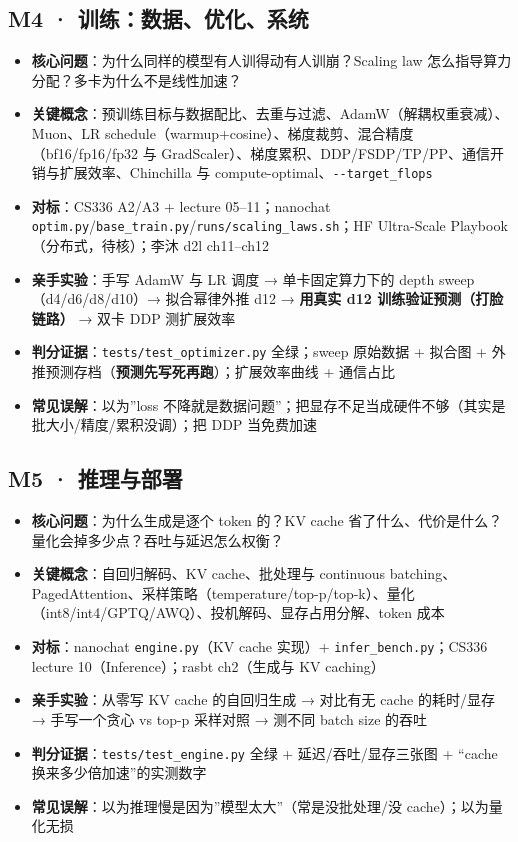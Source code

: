\documentclass[
  chinese,
  11pt,
]{ctexart}
\providecommand{\tightlist}{%
  \setlength{\itemsep}{0pt}\setlength{\parskip}{0pt}}
\begin{document}
\subsection{M4 · 训练：数据、优化、系统}\label{m4-ux8badux7ec3ux6570ux636eux4f18ux5316ux7cfbux7edf}

\begin{itemize}
\tightlist
\item
  \textbf{核心问题}：为什么同样的模型有人训得动有人训崩？Scaling law 怎么指导算力分配？多卡为什么不是线性加速？
\item
  \textbf{关键概念}：预训练目标与数据配比、去重与过滤、AdamW（解耦权重衰减）、Muon、LR schedule（warmup+cosine）、梯度裁剪、混合精度（bf16/fp16/fp32 与 GradScaler）、梯度累积、DDP/FSDP/TP/PP、通信开销与扩展效率、Chinchilla 与 compute-optimal、\texttt{-\/-target\_flops}
\item
  \textbf{对标}：CS336 A2/A3 + lecture 05--11；nanochat \texttt{optim.py}/\texttt{base\_train.py}/\texttt{runs/scaling\_laws.sh}；HF Ultra-Scale Playbook（分布式，待核）；李沐 d2l ch11--ch12
\item
  \textbf{亲手实验}：手写 AdamW 与 LR 调度 → 单卡固定算力下的 depth sweep（d4/d6/d8/d10）→ 拟合幂律外推 d12 → \textbf{用真实 d12 训练验证预测（打脸链路）} → 双卡 DDP 测扩展效率
\item
  \textbf{判分证据}：\texttt{tests/test\_optimizer.py} 全绿；sweep 原始数据 + 拟合图 + 外推预测存档（\textbf{预测先写死再跑}）；扩展效率曲线 + 通信占比
\item
  \textbf{常见误解}：以为''loss 不降就是数据问题''；把显存不足当成硬件不够（其实是批大小/精度/累积没调）；把 DDP 当免费加速
\end{itemize}

\subsection{M5 · 推理与部署}\label{m5-ux63a8ux7406ux4e0eux90e8ux7f72}

\begin{itemize}
\tightlist
\item
  \textbf{核心问题}：为什么生成是逐个 token 的？KV cache 省了什么、代价是什么？量化会掉多少点？吞吐与延迟怎么权衡？
\item
  \textbf{关键概念}：自回归解码、KV cache、批处理与 continuous batching、PagedAttention、采样策略（temperature/top-p/top-k）、量化（int8/int4/GPTQ/AWQ）、投机解码、显存占用分解、token 成本
\item
  \textbf{对标}：nanochat \texttt{engine.py}（KV cache 实现）+ \texttt{infer\_bench.py}；CS336 lecture 10（Inference）；rasbt ch2（生成与 KV caching）
\item
  \textbf{亲手实验}：从零写 KV cache 的自回归生成 → 对比有无 cache 的耗时/显存 → 手写一个贪心 vs top-p 采样对照 → 测不同 batch size 的吞吐
\item
  \textbf{判分证据}：\texttt{tests/test\_engine.py} 全绿 + 延迟/吞吐/显存三张图 + ``cache 换来多少倍加速''的实测数字
\item
  \textbf{常见误解}：以为推理慢是因为''模型太大''（常是没批处理/没 cache）；以为量化无损
\end{itemize}
\end{document}
